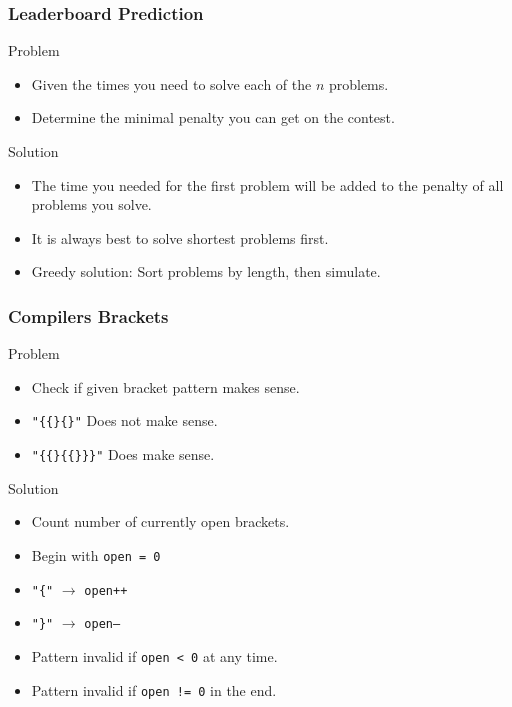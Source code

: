 \documentclass{beamer}
\begin{document}
\begin{frame}
    \frametitle{Leaderboard Prediction}
    \begin{block}{Problem}
        \begin{itemize}
            \item Given the times you need to solve each of the $n$ problems.
            \item Determine the minimal penalty you can get on the contest.
        \end{itemize}
    \end{block}
    \begin{block}{Solution}
        \begin{itemize}
            \item The time you needed for the first problem will be added to the penalty of all problems you solve.
            \item It is always best to solve shortest problems first.
            \item Greedy solution: Sort problems by length, then simulate.
        \end{itemize}
    \end{block}
\end{frame}

\begin{frame}
    \frametitle{Compilers Brackets}
    \begin{block}{Problem}
        \begin{itemize}
            \item Check if given bracket pattern makes sense.
            \item {\tt"\{\{\}\{\}"} Does not make sense.
            \item {\tt"\{\{\}\{\{\}\}\}"} Does make sense.
        \end{itemize}
    \end{block}
    \begin{block}{Solution}
        \begin{itemize}
            \item Count number of currently open brackets.
            \item Begin with {\tt open = 0}
            \item {\tt"\{"} $\rightarrow$ {\tt open++}
            \item {\tt"\}"} $\rightarrow$ {\tt open--}
            \item Pattern invalid if {\tt open < 0} at any time.
            \item Pattern invalid if {\tt open != 0} in the end.
        \end{itemize}
    \end{block}
\end{frame}
\end{document}
